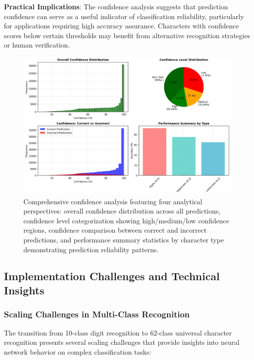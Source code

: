 \documentclass[11pt,a4paper]{report}
\begin{document}
\textbf{Practical Implications}: The confidence analysis suggests that prediction confidence can serve as a useful indicator of classification reliability, particularly for applications requiring high accuracy assurance. Characters with confidence scores below certain thresholds may benefit from alternative recognition strategies or human verification.

\begin{figure}[H]
\centering
\includegraphics[width=\textwidth]{universal_confidence_analysis.png}
\caption{Comprehensive confidence analysis featuring four analytical perspectives: overall confidence distribution across all predictions, confidence level categorization showing high/medium/low confidence regions, confidence comparison between correct and incorrect predictions, and performance summary statistics by character type demonstrating prediction reliability patterns.}
\label{fig:universal_confidence}
\end{figure}

\subsection{Implementation Challenges and Technical Insights}

\subsubsection{Scaling Challenges in Multi-Class Recognition}

The transition from 10-class digit recognition to 62-class universal character recognition presents several scaling challenges that provide insights into neural network behavior on complex classification tasks:
\end{document}
